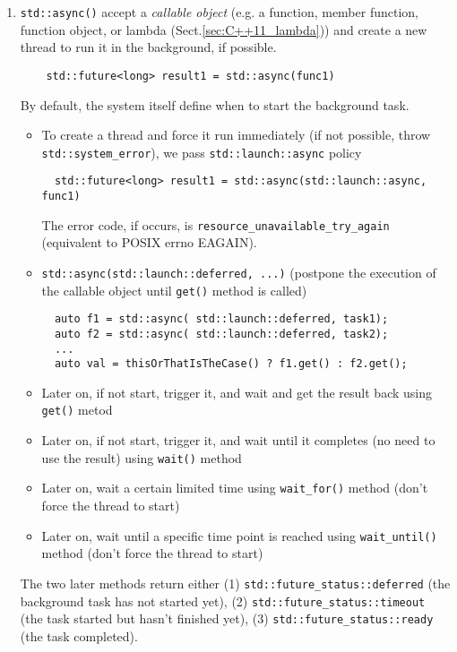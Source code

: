 \begin{enumerate}
  \item \verb!std::async()!	accept a {\it callable object} (e.g. a function,
  member function, function object, or lambda (Sect.\ref{sec:C++11_lambda})) and
  create a new thread to run it in the background, if possible. 
  \begin{verbatim}
    std::future<long> result1 = std::async(func1)
  \end{verbatim}
  By default, the system itself define when to start the background task. 
  \begin{itemize}
    \item  To create a thread and force it run immediately (if not possible,
    throw \verb!std::system_error!), we pass \verb!std::launch::async! policy
  \begin{verbatim}
  std::future<long> result1 = std::async(std::launch::async, func1)
  \end{verbatim}
  The error code, if occurs, is \verb!resource_unavailable_try_again!
  (equivalent to POSIX errno EAGAIN).
  
  \item \verb!std::async(std::launch::deferred, ...)! (postpone the execution
  of the callable object until \verb!get()! method is called)
  \begin{lstlisting}
  auto f1 = std::async( std::launch::deferred, task1);
  auto f2 = std::async( std::launch::deferred, task2);
  ...
  auto val = thisOrThatIsTheCase() ? f1.get() : f2.get();
  \end{lstlisting}
  
    \item Later on, if not start, trigger it, and wait and get the result
    back using \verb!get()! metod
    \item Later on, if not start, trigger it, and wait until it completes (no
    need to use the result) using \verb!wait()! method
    \item Later on, wait a certain limited time using \verb!wait_for()! method
    (don't force the thread to start)
    \item Later on, wait until a specific time point is reached using
    \verb!wait_until()! method (don't force the thread to start)
  \end{itemize}
  The two later methods return either (1) \verb!std::future_status::deferred!
  (the background task has not started yet), (2)
  \verb!std::future_status::timeout! (the task started but hasn't finished
  yet), (3) \verb!std::future_status::ready! (the task completed).
  

\end{enumerate}
